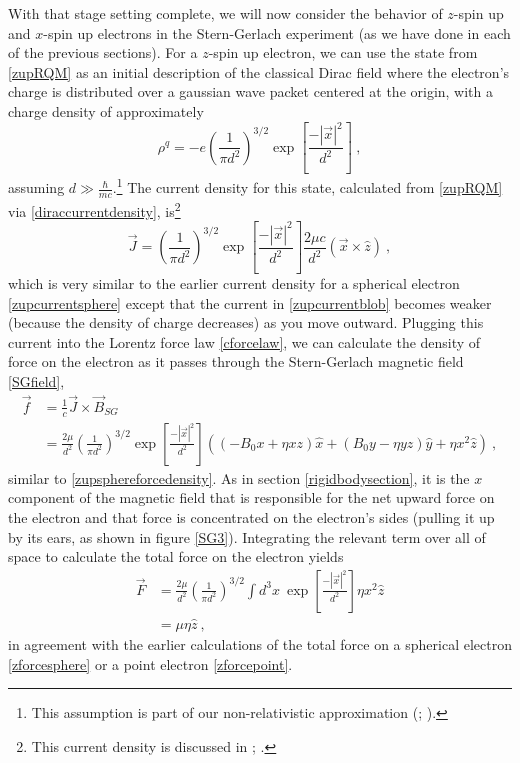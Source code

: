 \documentclass[onecolumn,secnumarabic,amsmath,amssymb,balancelastpage,nofootinbib]{article}
\begin{document}
With that stage setting complete, we will now consider the behavior of $z$-spin up and $x$-spin up electrons in the Stern-Gerlach experiment (as we have done in each of the previous sections).  For a $z$-spin up electron, we can use the state from \eqref{zupRQM} as an initial description of the classical Dirac field where the electron's charge is distributed over a gaussian wave packet centered at the origin, with a charge density of approximately
\begin{equation}
\rho^q=-e\left(\frac{1}{\pi d^2}\right)^{3/2}\exp\left[\frac{-|\vec{x}|^2}{d^2}\right] 
\ ,
\label{zupchargeblob}
\end{equation}
assuming $d\gg\frac{\hbar}{mc}$.\footnote{This assumption is part of our non-relativistic approximation (\citealp[pg.\ 39]{bjorkendrell}; \citealp[sec.\ 5]{howelectronsspin}).}  The current density for this state, calculated from \eqref{zupRQM} via \eqref{diraccurrentdensity}, is\footnote{This current density is discussed in \citet[sec.\ 4]{ohanian}; \citet[eq.\ 31]{howelectronsspin}.}
\begin{equation}
\vec{J}=\left(\frac{1}{\pi d^2}\right)^{3/2} \exp\left[\frac{-|\vec{x}|^2}{d^2}\right] \frac{2 \mu c}{d^2} (\vec{x} \times \hat{z})
\ ,
\label{zupcurrentblob}
\end{equation}
which is very similar to the earlier current density for a spherical electron \eqref{zupcurrentsphere} except that the current in \eqref{zupcurrentblob} becomes weaker (because the density of charge decreases) as you move outward.  Plugging this current into the Lorentz force law \eqref{cforcelaw}, we can calculate the density of force on the electron as it passes through the Stern-Gerlach magnetic field \eqref{SGfield},
\begin{align}
\vec{f}&=\frac{1}{c} \vec{J} \times \vec{B}_{SG}
\nonumber
\\
&=\frac{2 \mu}{d^2}\left(\frac{1}{\pi d^2}\right)^{3/2} \exp\left[\frac{-|\vec{x}|^2}{d^2}\right] \left( (-B_0 x + \eta x z) \hat{x} + (B_0 y - \eta y z)\hat{y} + \eta x^2 \hat{z} 
\right)
\ ,
\label{zupforcedensityblob}
\end{align}
similar to \eqref{zupsphereforcedensity}.  As in section \ref{rigidbodysection}, it is the $x$ component of the magnetic field that is responsible for the net upward force on the electron and that force is concentrated on the electron's sides (pulling it up by its ears, as shown in figure \ref{SG3}).  Integrating the relevant term over all of space to calculate the total force on the electron yields
\begin{align}
\vec{F} &= \frac{2 \mu}{d^2}\left(\frac{1}{\pi d^2}\right)^{3/2}\int{d^3x\  \exp\left[\frac{-|\vec{x}|^2}{d^2}\right]\eta x^2} \hat{z}
\nonumber
\\
&= \mu \eta \hat{z}
\ ,
\end{align}
in agreement with the earlier calculations of the total force on a spherical electron \eqref{zforcesphere} or a point electron \eqref{zforcepoint}.
\end{document}

